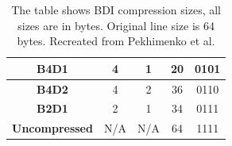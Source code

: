 \begin{table}[]
\begin{tabular}{|c|c|c|c|c|}
\textbf{B4D1}         & 4                                                            & 1                                                             & 20                                                                  & 0101                                                                    \\ \hline
\textbf{B4D2}         & 4                                                            & 2                                                             & 36                                                                  & 0110                                                                    \\ \hline
\textbf{B2D1}         & 2                                                            & 1                                                             & 34                                                                  & 0111                                                                    \\ \hline
\textbf{Uncompressed} & N/A                                                          & N/A                                                           & 64                                                                  & 1111                                                                    \\ \hline
\end{tabular}
\caption[BDI Sizes]{The table shows BDI compression sizes, all sizes are in bytes. Original line size is 64 bytes. Recreated from Pekhimenko et al.\protect\cite{bdi}}
\label{tab:BDICompressionSizes}
\end{table}
